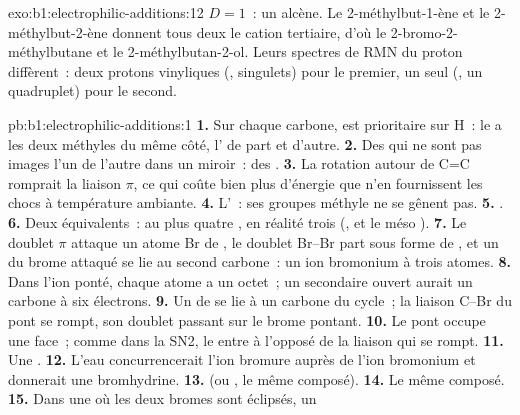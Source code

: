\begin{solution}{exo:b1:electrophilic-additions:12}
$D = 1$~: un alcène. Le 2-méthylbut-1-ène et le 2-méthylbut-2-ène donnent
tous deux le cation tertiaire, d'où le 2-bromo-2-méthylbutane et le
2-méthylbutan-2-ol. Leurs spectres de RMN du proton diffèrent~: deux
protons vinyliques (, singulets) pour le premier, un seul
(, un quadruplet) pour le second.
\end{solution}

\begin{solution}{pb:b1:electrophilic-additions:1}
\textbf{1.} Sur chaque carbone,  est prioritaire sur H~: le
 a les deux méthyles du même côté, l' de part et d'autre.
\textbf{2.} Des  qui ne sont pas images l'un de l'autre
dans un miroir~: des .
\textbf{3.} La rotation autour de C=C romprait la liaison $\pi$, ce qui
coûte bien plus d'énergie que n'en fournissent les chocs à température
ambiante.
\textbf{4.} L'~: ses groupes méthyle ne se gênent pas.
\textbf{5.} .
\textbf{6.} Deux  équivalents~: au plus quatre
, en réalité trois
(,  et le méso ).
\textbf{7.} Le doublet $\pi$ attaque un atome Br de , le doublet
Br--Br part sous forme de , et un  du brome
attaqué se lie au second carbone~: un ion bromonium à trois atomes.
\textbf{8.} Dans l'ion ponté, chaque atome a un octet~; un 
secondaire ouvert aurait un carbone à six électrons.
\textbf{9.} Un  de  se lie à un carbone du
cycle~; la liaison C--Br du pont se rompt, son doublet passant sur le
brome pontant.
\textbf{10.} Le pont occupe une face~; comme dans la SN2, le 
entre à l'opposé de la liaison qui se rompt.
\textbf{11.} Une .
\textbf{12.} L'eau concurrencerait l'ion bromure auprès de l'ion
bromonium et donnerait une bromhydrine.
\textbf{13.}  (ou , le même composé).
\textbf{14.} Le même composé.
\textbf{15.} Dans une  où les deux bromes sont éclipsés, un

\end{solution}
